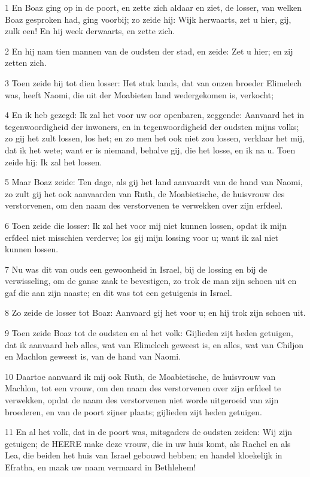 \par 1 En Boaz ging op in de poort, en zette zich aldaar en ziet, de losser, van welken Boaz gesproken had, ging voorbij; zo zeide hij: Wijk herwaarts, zet u hier, gij, zulk een! En hij week derwaarts, en zette zich.
\par 2 En hij nam tien mannen van de oudsten der stad, en zeide: Zet u hier; en zij zetten zich.
\par 3 Toen zeide hij tot dien losser: Het stuk lands, dat van onzen broeder Elimelech was, heeft Naomi, die uit der Moabieten land wedergekomen is, verkocht;
\par 4 En ik heb gezegd: Ik zal het voor uw oor openbaren, zeggende: Aanvaard het in tegenwoordigheid der inwoners, en in tegenwoordigheid der oudsten mijns volks; zo gij het zult lossen, los het; en zo men het ook niet zou lossen, verklaar het mij, dat ik het wete; want er is niemand, behalve gij, die het losse, en ik na u. Toen zeide hij: Ik zal het lossen.
\par 5 Maar Boaz zeide: Ten dage, als gij het land aanvaardt van de hand van Naomi, zo zult gij het ook aanvaarden van Ruth, de Moabietische, de huisvrouw des verstorvenen, om den naam des verstorvenen te verwekken over zijn erfdeel.
\par 6 Toen zeide die losser: Ik zal het voor mij niet kunnen lossen, opdat ik mijn erfdeel niet misschien verderve; los gij mijn lossing voor u; want ik zal niet kunnen lossen.
\par 7 Nu was dit van ouds een gewoonheid in Israel, bij de lossing en bij de verwisseling, om de ganse zaak te bevestigen, zo trok de man zijn schoen uit en gaf die aan zijn naaste; en dit was tot een getuigenis in Israel.
\par 8 Zo zeide de losser tot Boaz: Aanvaard gij het voor u; en hij trok zijn schoen uit.
\par 9 Toen zeide Boaz tot de oudsten en al het volk: Gijlieden zijt heden getuigen, dat ik aanvaard heb alles, wat van Elimelech geweest is, en alles, wat van Chiljon en Machlon geweest is, van de hand van Naomi.
\par 10 Daartoe aanvaard ik mij ook Ruth, de Moabietische, de huisvrouw van Machlon, tot een vrouw, om den naam des verstorvenen over zijn erfdeel te verwekken, opdat de naam des verstorvenen niet worde uitgeroeid van zijn broederen, en van de poort zijner plaats; gijlieden zijt heden getuigen.
\par 11 En al het volk, dat in de poort was, mitsgaders de oudsten zeiden: Wij zijn getuigen; de HEERE make deze vrouw, die in uw huis komt, als Rachel en als Lea, die beiden het huis van Israel gebouwd hebben; en handel kloekelijk in Efratha, en maak uw naam vermaard in Bethlehem!
